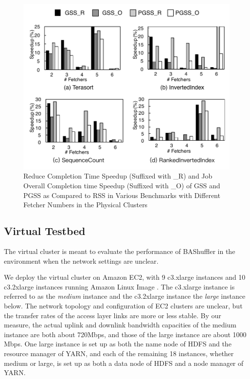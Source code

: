 \documentclass[10pt,journal,compsoc]{IEEEtran}
\begin{document}
\begin{figure}[!t]
\centering
\includegraphics[width=1\columnwidth]{figure8}
\caption{Reduce Completion Time Speedup (Suffixed with \_R) and Job Overall Completion time Speedup (Suffixed with \_O) of GSS and PGSS as Compared to RSS in Various Benchmarks with Different Fetcher Numbers
in the Physical Clusters}
\label{fig:new_speedup}
\end{figure}

\subsection{Virtual Testbed}
The virtual cluster is meant to evaluate the performance of BAShuffler in the environment when the network settings are unclear. 

We deploy the virtual cluster on Amazon EC2, with 9 c3.xlarge
instances and 10 c3.2xlarge instances running
Amazon Linux Image \cite{aws}. The c3.xlarge instance is referred to as the \emph{medium} instance 
and the c3.2xlarge instance the \emph{large} instance below. 
The network topology and configuration of EC2 clusters are unclear, 
but the transfer rates of the access layer links are more or less stable. 
By our measure, the actual uplink and downlink bandwidth capacities of
the medium instance are both about 720Mbps, 
and those of the large instance are about 1000 Mbps. 
One large instance is set up as both the name node of HDFS and the
resource manager of YARN,
and each of the remaining 18 instances, whether medium or large,
is set up as both a data node of HDFS and a node manager of YARN. 
\end{document}
